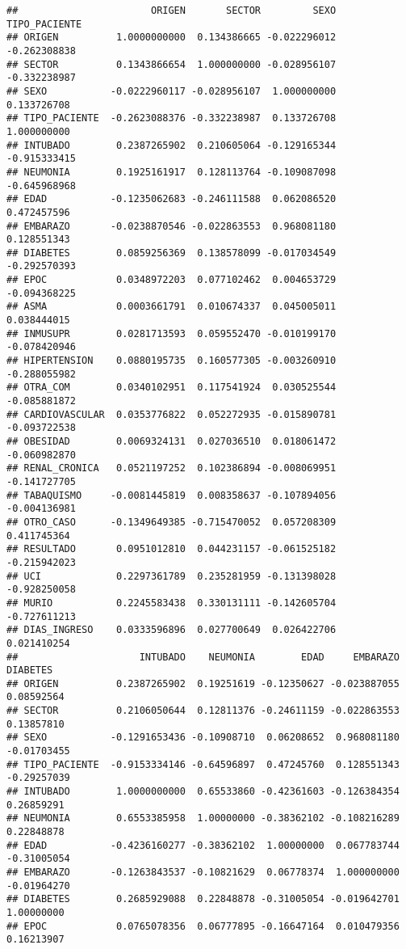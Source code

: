 \documentclass[]{article}
\begin{document}
\begin{verbatim}
##                       ORIGEN       SECTOR         SEXO TIPO_PACIENTE
## ORIGEN          1.0000000000  0.134386665 -0.022296012  -0.262308838
## SECTOR          0.1343866654  1.000000000 -0.028956107  -0.332238987
## SEXO           -0.0222960117 -0.028956107  1.000000000   0.133726708
## TIPO_PACIENTE  -0.2623088376 -0.332238987  0.133726708   1.000000000
## INTUBADO        0.2387265902  0.210605064 -0.129165344  -0.915333415
## NEUMONIA        0.1925161917  0.128113764 -0.109087098  -0.645968968
## EDAD           -0.1235062683 -0.246111588  0.062086520   0.472457596
## EMBARAZO       -0.0238870546 -0.022863553  0.968081180   0.128551343
## DIABETES        0.0859256369  0.138578099 -0.017034549  -0.292570393
## EPOC            0.0348972203  0.077102462  0.004653729  -0.094368225
## ASMA            0.0003661791  0.010674337  0.045005011   0.038444015
## INMUSUPR        0.0281713593  0.059552470 -0.010199170  -0.078420946
## HIPERTENSION    0.0880195735  0.160577305 -0.003260910  -0.288055982
## OTRA_COM        0.0340102951  0.117541924  0.030525544  -0.085881872
## CARDIOVASCULAR  0.0353776822  0.052272935 -0.015890781  -0.093722538
## OBESIDAD        0.0069324131  0.027036510  0.018061472  -0.060982870
## RENAL_CRONICA   0.0521197252  0.102386894 -0.008069951  -0.141727705
## TABAQUISMO     -0.0081445819  0.008358637 -0.107894056  -0.004136981
## OTRO_CASO      -0.1349649385 -0.715470052  0.057208309   0.411745364
## RESULTADO       0.0951012810  0.044231157 -0.061525182  -0.215942023
## UCI             0.2297361789  0.235281959 -0.131398028  -0.928250058
## MURIO           0.2245583438  0.330131111 -0.142605704  -0.727611213
## DIAS_INGRESO    0.0333596896  0.027700649  0.026422706   0.021410254
##                     INTUBADO    NEUMONIA        EDAD     EMBARAZO    DIABETES
## ORIGEN          0.2387265902  0.19251619 -0.12350627 -0.023887055  0.08592564
## SECTOR          0.2106050644  0.12811376 -0.24611159 -0.022863553  0.13857810
## SEXO           -0.1291653436 -0.10908710  0.06208652  0.968081180 -0.01703455
## TIPO_PACIENTE  -0.9153334146 -0.64596897  0.47245760  0.128551343 -0.29257039
## INTUBADO        1.0000000000  0.65533860 -0.42361603 -0.126384354  0.26859291
## NEUMONIA        0.6553385958  1.00000000 -0.38362102 -0.108216289  0.22848878
## EDAD           -0.4236160277 -0.38362102  1.00000000  0.067783744 -0.31005054
## EMBARAZO       -0.1263843537 -0.10821629  0.06778374  1.000000000 -0.01964270
## DIABETES        0.2685929088  0.22848878 -0.31005054 -0.019642701  1.00000000
## EPOC            0.0765078356  0.06777895 -0.16647164  0.010479356  0.16213907

\end{verbatim}
\end{document}
